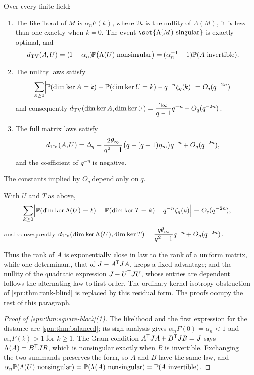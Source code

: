\begin{theorem}\label{spn:thm:square-block}
Over every finite field:
\begin{enumerate}
\item The likelihood of $M$ is $\alpha_nF(k)$, where $2k$ is the nullity of $\Lambda(M)$; it is
less than one exactly when $k=0$. The event $\set{\Lambda(M)\text{ singular}}$ is exactly
optimal, and
\[
 d_{\mathrm{TV}}(A,U)=(1-\alpha_n)\mathbb{P}\bigl(\Lambda(U)\text{ nonsingular}\bigr)
 =(\alpha_n^{-1}-1)\mathbb{P}(A\text{ invertible}).
\]
\item The nullity laws satisfy
\[
 \sum_{k\ge0}\Bigl|\mathbb{P}(\dim\ker A=k)-\mathbb{P}(\dim\ker U=k)-q^{-n}\xi_q(k)\Bigr|=O_q(q^{-2n}),
\]
and consequently
$d_{\mathrm{TV}}(\dim\ker A,\dim\ker U)=\dfrac{\gamma_\infty}{q-1}q^{-n}+O_q(q^{-2n})$.
\item The full matrix laws satisfy
\[
 d_{\mathrm{TV}}(A,U)=\Delta_q+\frac{2\theta_\infty}{q^2-1}\bigl(q-(q+1)\eta_\infty\bigr)q^{-n}+O_q(q^{-2n}),
\]
and the coefficient of $q^{-n}$ is negative.
\end{enumerate}
The constants implied by $O_q$ depend only on $q$.
\end{theorem}

\begin{theorem}\label{spn:thm:defect-universality}
With $U$ and $T$ as above,
\[
 \sum_{k\ge0}\Bigl|\mathbb{P}(\dim\ker\Lambda(U)=k)-\mathbb{P}(\dim\ker T=k)-q^{-n}\zeta_q(k)\Bigr|
 =O_q(q^{-2n}),
\]
and consequently
$d_{\mathrm{TV}}(\dim\ker\Lambda(U),\dim\ker T)=\dfrac{q\theta_\infty}{q^2-1}q^{-n}+O_q(q^{-2n})$.
\end{theorem}

Thus the rank of $A$ is exponentially close in law to the rank of a uniform matrix, while one
determinant, that of $J-A^{\mathsf{T}}JA$, keeps a fixed advantage; and the nullity of the quadratic
expression $J-U^{\mathsf{T}}JU$, whose entries are dependent, follows the alternating law to first
order. The ordinary kernel-isotropy obstruction of \cref{spn:thm:rank-blind} is replaced by this
residual form. The proofs occupy the rest of this paragraph.

\begin{proof}[Proof of \cref{spn:thm:square-block}(1)]
The likelihood and the first expression for the distance are \cref{spn:thm:balanced}; its
sign analysis gives $\alpha_nF(0)=\alpha_n<1$ and $\alpha_nF(k)>1$ for $k\ge1$. The Gram
condition $A^{\mathsf{T}}JA+B^{\mathsf{T}}JB=J$ says $\Lambda(A)=B^{\mathsf{T}}JB$, which is nonsingular exactly
when $B$ is invertible. Exchanging the two summands preserves the form, so $A$ and $B$ have the
same law, and
$\alpha_n\mathbb{P}(\Lambda(U)\text{ nonsingular})=\mathbb{P}(\Lambda(A)\text{ nonsingular})
=\mathbb{P}(A\text{ invertible})$.
\end{proof}

